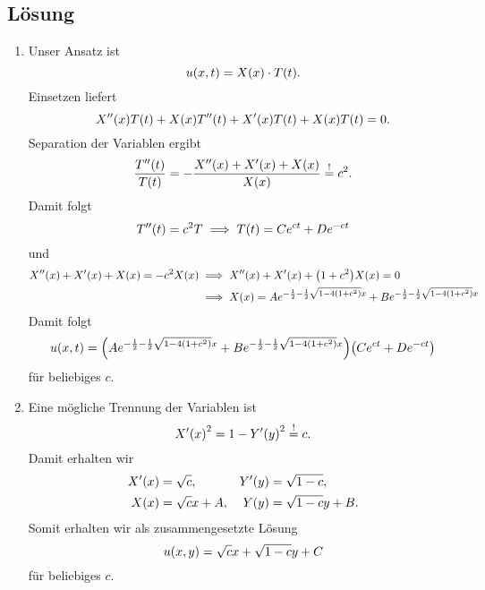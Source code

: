 \documentclass{exercise}
\begin{document}
    \subsection*{Lösung}
    \begin{enumerate}
        \item Unser Ansatz ist
        \[
            u\parentheses*{x, t} = X\parentheses*{x} \cdot T\parentheses*{t}.
        \]
        Einsetzen liefert
        \[
            X''\parentheses*{x}T\parentheses*{t} + X\parentheses*{x}T''\parentheses*{t} + X'\parentheses*{x}T\parentheses*{t} + X\parentheses*{x}T\parentheses*{t} = 0.
        \]
        Separation der Variablen ergibt
        \[
            \frac{T''\parentheses*{t}}{T\parentheses*{t}} = -\frac{X''\parentheses*{x} + X'\parentheses*{x} + X\parentheses*{x}}{X\parentheses*{x}} \stackrel{!}{=} c^2.
        \]
        Damit folgt
        \[
            T''\parentheses*{t} = c^2 T \implies T\parentheses*{t} = Ce^{ct} + De^{-ct}
        \]
        und
        \begin{align*}
            X''\parentheses*{x} + X'\parentheses*{x} + X\parentheses*{x} = -c^2 X\parentheses*{x} &\implies X''\parentheses*{x} + X'\parentheses*{x} + \parentheses*{1 + c^2}X\parentheses*{x} = 0\\
            &\implies X\parentheses*{x} = Ae^{-\frac{1}{2} - \frac{1}{2}\sqrt{1 - 4\parentheses*{1 + c^2}}x} + Be^{-\frac{1}{2} - \frac{1}{2}\sqrt{1 - 4\parentheses*{1 + c^2}}x}
        \end{align*}
        Damit folgt
        \[
            u\parentheses*{x, t} = \parentheses*{Ae^{-\frac{1}{2} - \frac{1}{2}\sqrt{1 - 4\parentheses*{1 + c^2}}x} + Be^{-\frac{1}{2} - \frac{1}{2}\sqrt{1 - 4\parentheses*{1 + c^2}}x}}\parentheses*{Ce^{ct} + De^{-ct}}
        \]
        für beliebiges \(c\).
        \item Eine mögliche Trennung der Variablen ist
        \[
            X'\parentheses*{x}^2 = 1 - Y'\parentheses*{y}^2 \stackrel{!}{=} c.
        \]
        Damit erhalten wir 
        \begin{align*}
            X'\parentheses*{x} &= \sqrt{c}, & Y'\parentheses*{y} &= \sqrt{1 - c},\\
            X\parentheses*{x} &= \sqrt{c}x + A, & Y\parentheses*{y} &= \sqrt{1 - c}y + B.
        \end{align*}
        Somit erhalten wir als zusammengesetzte Lösung
        \[
            u\parentheses*{x, y} = \sqrt{c}x + \sqrt{1 - c}y + C
        \]
        für beliebiges \(c\).
    \end{enumerate}
\end{document}
